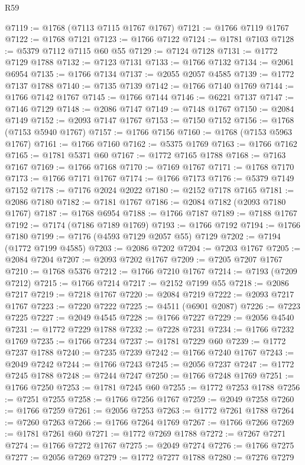 \begin{lexlean}{R59}
\begin{coremodule}
@7119 := @1768 (@7113 @7115 @1767 @1767)
@7121 := @1766 @7119 @1767
@7122 := @1768 @7121
@7123 := @1766 @7122
@7124 := @1781 @7103
@7128 := @5379 @7112 @7115 @60 @55
@7129 := @7124 @7128
@7131 := @1772 @7129 @1788
@7132 := @7123 @7131
@7133 := @1766 @7132
@7134 := @2061 @6954
@7135 := @1766 @7134
@7137 := @2055 @2057 @4585
@7139 := @1772 @7137 @1788
@7140 := @7135 @7139
@7142 := @1766 @7140 @1769
@7144 := @1766 @7142 @1767
@7145 := @1766 @7144
@7146 := @6221 @7137
@7147 := @7146 @7129
@7148 := @2086 @7147
@7149 := @7148 @1767
@7150 := @2084 @7149
@7152 := @2093 @7147 @1767
@7153 := @7150 @7152
@7156 := @1768 (@7153 @5940 @1767)
@7157 := @1766 @7156
@7160 := @1768 (@7153 @5963 @1767)
@7161 := @1766 @7160
@7162 := @5375 @1769
@7163 := @1766 @7162
@7165 := @1781 @5371 @60
@7167 := @1772 @7165 @1788
@7168 := @7163 @7167
@7169 := @1766 @7168
@7170 := @7169 @1767
@7171 := @1768 @7170
@7173 := @1766 @7171 @1767
@7174 := @1766 @7173
@7176 := @5379 @7149 @7152
@7178 := @7176 @2024 @2022
@7180 := @2152 @7178 @7165
@7181 := @2086 @7180
@7182 := @7181 @1767
@7186 := @2084 @7182 (@2093 @7180 @1767)
@7187 := @1768 @6954
@7188 := @1766 @7187
@7189 := @7188 @1767
@7192 := @7174 (@7186 @7189 @1769)
@7193 := @1766 @7192
@7194 := @1766 @7180
@7199 := @7176 (@4593 @7129 @2057 @55) @7129
@7202 := @7194 (@1772 @7199 @4585)
@7203 := @2086 @7202
@7204 := @7203 @1767
@7205 := @2084 @7204
@7207 := @2093 @7202 @1767
@7209 := @7205 @7207 @1767
@7210 := @1768 @5376
@7212 := @1766 @7210 @1767
@7214 := @7193 (@7209 @7212)
@7215 := @1766 @7214
@7217 := @2152 @7199 @55
@7218 := @2086 @7217
@7219 := @7218 @1767
@7220 := @2084 @7219
@7222 := @2093 @7217 @1767
@7223 := @7220 @7222
@7225 := @4511 (@6901 @2087)
@7226 := @7223 @7225
@7227 := @2049 @4545
@7228 := @1766 @7227
@7229 := @2056 @4540
@7231 := @1772 @7229 @1788
@7232 := @7228 @7231
@7234 := @1766 @7232 @1769
@7235 := @1766 @7234
@7237 := @1781 @7229 @60
@7239 := @1772 @7237 @1788
@7240 := @7235 @7239
@7242 := @1766 @7240 @1767
@7243 := @2049 @7242
@7244 := @1766 @7243
@7245 := @2056 @7237
@7247 := @1772 @7245 @1788
@7248 := @7244 @7247
@7250 := @1766 @7248 @1769
@7251 := @1766 @7250
@7253 := @1781 @7245 @60
@7255 := @1772 @7253 @1788
@7256 := @7251 @7255
@7258 := @1766 @7256 @1767
@7259 := @2049 @7258
@7260 := @1766 @7259
@7261 := @2056 @7253
@7263 := @1772 @7261 @1788
@7264 := @7260 @7263
@7266 := @1766 @7264 @1769
@7267 := @1766 @7266
@7269 := @1781 @7261 @60
@7271 := @1772 @7269 @1788
@7272 := @7267 @7271
@7274 := @1766 @7272 @1767
@7275 := @2049 @7274
@7276 := @1766 @7275
@7277 := @2056 @7269
@7279 := @1772 @7277 @1788
@7280 := @7276 @7279

\end{coremodule}
\end{lexlean}
